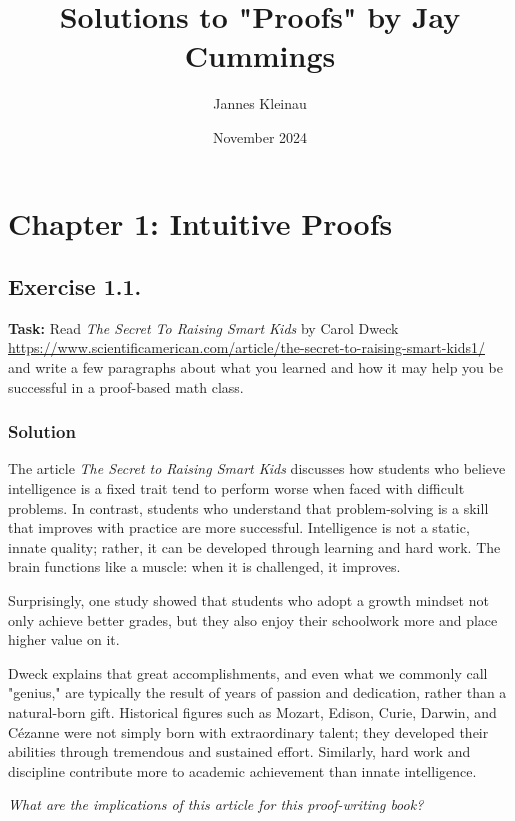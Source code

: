 \documentclass{article}
\title{Solutions to "Proofs" by Jay Cummings}
\author{Jannes Kleinau}
\date{November 2024}
\begin{document}
\maketitle
\tableofcontents %

\section{Chapter 1: Intuitive Proofs}
\subsection{Exercise 1.1.}
\textbf{Task:} Read \textit{The Secret To Raising Smart Kids} by Carol Dweck \\
\url{https://www.scientificamerican.com/article/the-secret-to-raising-smart-kids1/} \\
and write a few paragraphs about what you learned and how it may help you be successful in a proof-based math class.

\subsubsection*{Solution}

The article \textit{The Secret to Raising Smart Kids} discusses how students who believe intelligence is a fixed trait tend to perform worse when faced with difficult problems. In contrast, students who understand that problem-solving is a skill that improves with practice are more successful. Intelligence is not a static, innate quality; rather, it can be developed through learning and hard work. The brain functions like a muscle: when it is challenged, it improves.

Surprisingly, one study showed that students who adopt a growth mindset not only achieve better grades, but they also enjoy their schoolwork more and place higher value on it.

Dweck explains that great accomplishments, and even what we commonly call "genius," are typically the result of years of passion and dedication, rather than a natural-born gift. Historical figures such as Mozart, Edison, Curie, Darwin, and Cézanne were not simply born with extraordinary talent; they developed their abilities through tremendous and sustained effort. Similarly, hard work and discipline contribute more to academic achievement than innate intelligence.

\vspace{1em} %
\textit{What are the implications of this article for this proof-writing book?}
\vspace{1em} %
\end{document}

